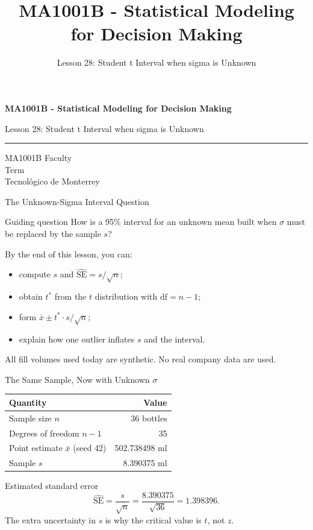 \documentclass[aspectratio=169,10pt,english]{beamer}
\title{MA1001B - Statistical Modeling for Decision Making}
\subtitle{Lesson 28: Student t Interval when sigma is Unknown}
\author{}
\institute{Tecnol\'ogico de Monterrey}
\date{}
\begin{document}
\begin{frame}[plain]
  \vspace{1.2cm}
  {\Large\bfseries MA1001B - Statistical Modeling for Decision Making\par}
  \vspace{0.7cm}
  {\large Lesson 28: Student t Interval when sigma is Unknown\par}
  \vspace{0.7cm}
  {\color{TecRojo}\rule{\textwidth}{1.2pt}}
  \vspace{0.8cm}

  MA1001B Faculty\\[0.3cm]
  Term\\[0.3cm]
  Tecnol\'ogico de Monterrey
\end{frame}

\begin{frame}{The Unknown-Sigma Interval Question}
  \begin{alertblock}{Guiding question}
    How is a 95\% interval for an unknown mean built when $\sigma$ must be
    replaced by the sample $s$?
  \end{alertblock}

  \vspace{0.6em}
  By the end of this lesson, you can:
  \begin{itemize}
    \item compute $s$ and $\widehat{\mathrm{SE}}=s/\sqrt{n}$;
    \item obtain $t^{*}$ from the $t$ distribution with $\mathrm{df}=n-1$;
    \item form $\bar{x}\pm t^{*}\cdot s/\sqrt{n}$;
    \item explain how one outlier inflates $s$ and the interval.
  \end{itemize}

  \vfill
  \scriptsize All fill volumes used today are synthetic. No real company data are used.
\end{frame}

\begin{frame}{The Same Sample, Now with Unknown $\sigma$}
  \small
  \begin{center}
    \begin{tabular}{lr}
      \toprule
      \textbf{Quantity} & \textbf{Value} \\
      \midrule
      Sample size $n$ & 36 bottles \\
      Degrees of freedom $n-1$ & 35 \\
      Point estimate $\bar{x}$ (seed 42) & 502.738498 ml \\
      Sample $s$ & 8.390375 ml \\
      \bottomrule
    \end{tabular}
  \end{center}

  \vspace{0.5em}
  \begin{exampleblock}{Estimated standard error}
    \[
      \widehat{\mathrm{SE}}=\frac{s}{\sqrt{n}}=\frac{8.390375}{\sqrt{36}}=1.398396.
    \]
    The extra uncertainty in $s$ is why the critical value is $t$, not $z$.
  \end{exampleblock}
\end{frame}
\end{document}
